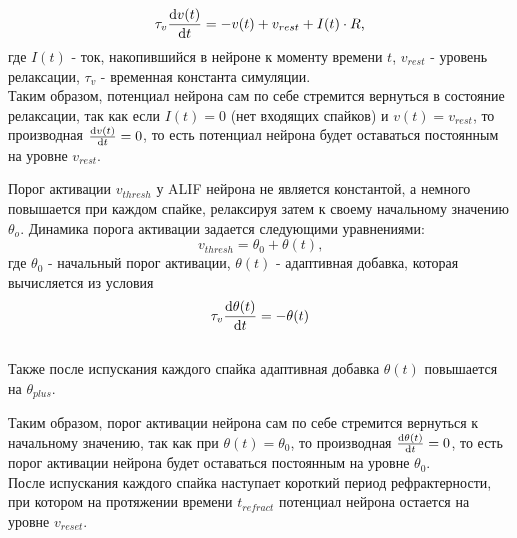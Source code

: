 \documentclass[a4paper]{article}
\begin{document}
\begin{equation} \label{eq:alif}
 \tau_v \dv{v(t)}{t} = -v(t) + v_{rest} + I(t) \cdot R \text{,}
\end{equation} где $I(t)$ - ток, накопившийся в нейроне к моменту времени $t$, $v_{rest}$ - уровень релаксации, $\tau_v$ - временная константа симуляции.\\ 

Таким образом, потенциал нейрона сам по себе стремится вернуться в состояние релаксации, так как если $I(t) = 0$ (нет входящих спайков) и $v(t) = v_{rest}$, то производная $\dv{v(t)}{t} = 0$, то есть потенциал нейрона будет оставаться постоянным на уровне $v_{rest}$. 

Порог активации $v_{thresh}$ у ALIF нейрона не является константой, а немного повышается при каждом спайке, релаксируя затем к своему начальному значению $\theta_o$. Динамика порога активации задается следующими уравнениями:
\begin{equation} 
 v_{thresh} = \theta_0 + \theta(t) \text{,}
\end{equation} где $\theta_0$ - начальный порог активации, $\theta(t)$ - адаптивная добавка, которая вычисляется из условия\\

\begin{equation}
 \tau_v \dv{\theta(t)}{t} = -\theta(t)
\end{equation}\\

Также после испускания каждого спайка адаптивная добавка $\theta(t)$ повышается на $\theta_{plus}$.

Таким образом, порог активации нейрона сам по себе стремится вернуться к начальному значению, так как при $\theta(t) = \theta_0$, то производная $\dv{\theta(t)}{t} = 0$, то есть порог активации нейрона будет оставаться постоянным на уровне $\theta_0$.\\

После испускания каждого спайка наступает короткий период рефрактерности, при котором на протяжении времени $t_{refract}$ потенциал нейрона остается на уровне $v_{reset}$.
\end{document}

